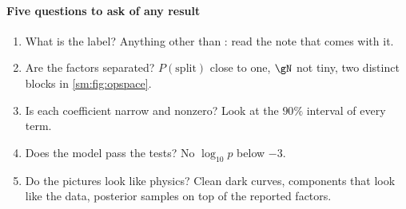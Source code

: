 \paragraph{Five questions to ask of any result}
\begin{enumerate}
\item What is the label? Anything other than \FC: read the note that comes with it.
\item Are the factors separated? $P(\text{split})$ close to one, $\gN$ not tiny, two distinct blocks in
\cref{sm:fig:opspace}.
\item Is each coefficient narrow and nonzero? Look at the $90\%$ interval of every term.
\item Does the model pass the tests? No $\log_{10}p$ below $-3$.
\item Do the pictures look like physics? Clean dark curves, components that look like the data, posterior samples on top
of the reported factors.
\end{enumerate}

